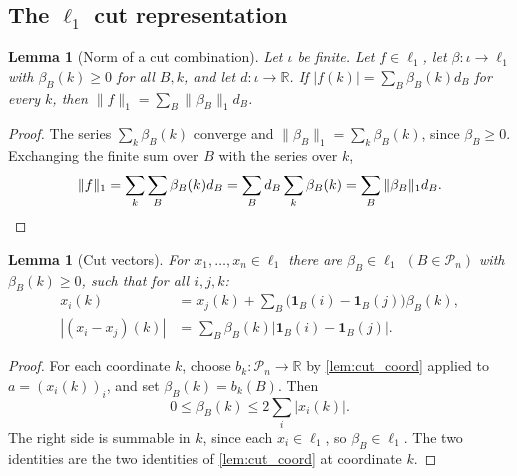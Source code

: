 \documentclass[11pt]{article}
\newtheorem{lemma}[theorem]{Lemma}
\theoremstyle{definition}
\theoremstyle{remark}
\newcommand{\one}{\mathbf{1}}
\newcommand{\R}{\mathbb{R}}
\newcommand{\Pn}{\mathcal{P}_n}
\begin{document}
\subsection{The $\ell_1$ cut representation}

\begin{lemma}[Norm of a cut combination]\label{lem:cut_l1_norm_combo}
Let $\iota$ be finite. Let $f\in\ell_1$, let $\beta:\iota\to\ell_1$ with $\beta_B(k)\ge0$ for all $B,k$, and let $d:\iota\to\R$. If $|f(k)|=\sum_B\beta_B(k)d_B$ for every $k$, then $\|f\|_1=\sum_B\|\beta_B\|_1d_B$.
\end{lemma}
\begin{proof}
The series $\sum_k\beta_B(k)$ converge and $\|\beta_B\|_1=\sum_k\beta_B(k)$, since $\beta_B\ge0$. Exchanging the finite sum over $B$ with the series over $k$,
\[
\|f\|_1=\sum_k\sum_B\beta_B(k)d_B=\sum_B d_B\sum_k\beta_B(k)=\sum_B\|\beta_B\|_1d_B. \qedhere
\]
\end{proof}

\begin{lemma}[Cut vectors]\label{lem:cut_l1_vectors}
For $x_1,\dots,x_n\in\ell_1$ there are $\beta_B\in\ell_1$ $(B\in\Pn)$ with $\beta_B(k)\ge0$, such that for all $i,j,k$:
\begin{align*}
x_i(k)&=x_j(k)+\sum_B\bigl(\one_B(i)-\one_B(j)\bigr)\beta_B(k),\\
|(x_i-x_j)(k)|&=\sum_B\beta_B(k)\bigl|\one_B(i)-\one_B(j)\bigr| .
\end{align*}
\end{lemma}
\begin{proof}
For each coordinate $k$, choose $b_k:\Pn\to\R$ by \cref{lem:cut_coord} applied to $a=(x_i(k))_i$, and set $\beta_B(k)=b_k(B)$. Then
\[
0\le\beta_B(k)\le2\sum_i|x_i(k)| .
\]
The right side is summable in $k$, since each $x_i\in\ell_1$, so $\beta_B\in\ell_1$. The two identities are the two identities of \cref{lem:cut_coord} at coordinate $k$.
\end{proof}
\end{document}
